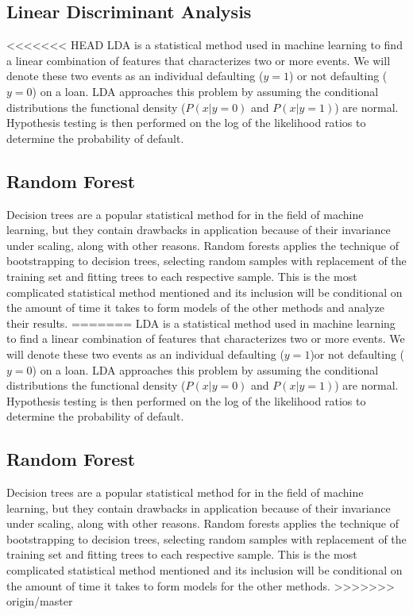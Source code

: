 \documentclass[sigconf, 11pt]{acmart}
\begin{document}
\subsection{Linear Discriminant Analysis}
<<<<<<< HEAD
LDA is a statistical method used in machine learning to find a linear combination of features that characterizes two or more events. We will denote these two events as an individual defaulting ($y=1$) or not defaulting ($y=0$) on a loan. LDA approaches this problem by assuming the conditional distributions the functional density ($P(x|y=0)$ and $P(x|y=1)$) are normal. Hypothesis testing is then performed on the log of the likelihood ratios to determine the probability of default.
\subsection{Random Forest}
Decision trees are a popular statistical method for in the field of machine learning, but they contain drawbacks in application because of their invariance under scaling, along with other reasons. Random forests applies the technique of bootstrapping to decision trees, selecting random samples with replacement of the training set and fitting trees to each respective sample. This is the most complicated statistical method mentioned and its inclusion will be conditional on the amount of time it takes to form models of the other methods and analyze their results.
=======
LDA is a statistical method used in machine learning to find a linear combination of features that characterizes two or more events. We will denote these two events as an individual defaulting ($y=1$)or not defaulting ($y=0$) on a loan. LDA approaches this problem by assuming the conditional distributions the functional density ($P(x|y=0)$ and $P(x|y=1)$) are normal. Hypothesis testing is then performed on the log of the likelihood ratios to determine the probability of default.
\subsection{Random Forest}
Decision trees are a popular statistical method for in the field of machine learning, but they contain drawbacks in application because of their invariance under scaling, along with other reasons. Random forests applies the technique of bootstrapping to decision trees, selecting random samples with replacement of the training set and fitting trees to each respective sample. This is the most complicated statistical method mentioned and its inclusion will be conditional on the amount of time it takes to form models for the other methods.
>>>>>>> origin/master
\end{document}
